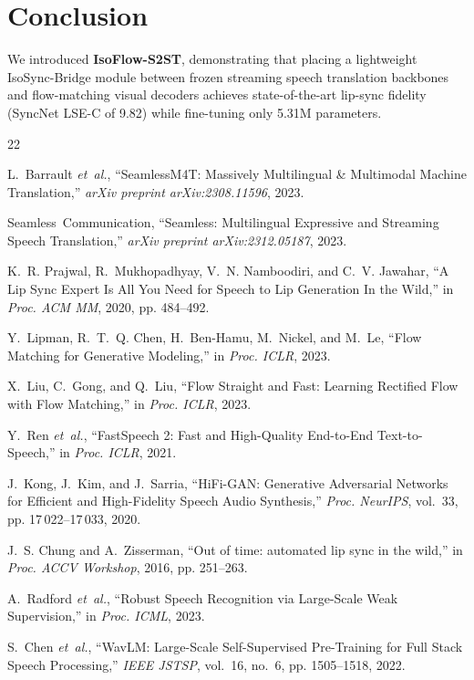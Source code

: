 \documentclass[10pt,journal,compsoc]{IEEEtran}
\begin{document}
\section{Conclusion}
We introduced \textbf{IsoFlow-S2ST}, demonstrating that placing a lightweight IsoSync-Bridge module between frozen streaming speech translation backbones and flow-matching visual decoders achieves state-of-the-art lip-sync fidelity (SyncNet LSE-C of 9.82) while fine-tuning only 5.31M parameters.

\begin{thebibliography}{22}

L.~Barrault \emph{et~al.}, ``SeamlessM4T: Massively Multilingual \& Multimodal Machine Translation,'' \emph{arXiv preprint arXiv:2308.11596}, 2023.

Seamless~Communication, ``Seamless: Multilingual Expressive and Streaming Speech Translation,'' \emph{arXiv preprint arXiv:2312.05187}, 2023.

K.~R. Prajwal, R.~Mukhopadhyay, V.~N. Namboodiri, and C.~V. Jawahar, ``A Lip Sync Expert Is All You Need for Speech to Lip Generation In the Wild,'' in \emph{Proc. ACM MM}, 2020, pp. 484--492.

Y.~Lipman, R.~T.~Q. Chen, H.~Ben-Hamu, M.~Nickel, and M.~Le, ``Flow Matching for Generative Modeling,'' in \emph{Proc. ICLR}, 2023.

X.~Liu, C.~Gong, and Q.~Liu, ``Flow Straight and Fast: Learning Rectified Flow with Flow Matching,'' in \emph{Proc. ICLR}, 2023.

Y.~Ren \emph{et~al.}, ``FastSpeech 2: Fast and High-Quality End-to-End Text-to-Speech,'' in \emph{Proc. ICLR}, 2021.

J.~Kong, J.~Kim, and J.~Sarria, ``HiFi-GAN: Generative Adversarial Networks for Efficient and High-Fidelity Speech Audio Synthesis,'' \emph{Proc. NeurIPS}, vol.~33, pp. 17\,022--17\,033, 2020.

J.~S. Chung and A.~Zisserman, ``Out of time: automated lip sync in the wild,'' in \emph{Proc. ACCV Workshop}, 2016, pp. 251--263.

A.~Radford \emph{et~al.}, ``Robust Speech Recognition via Large-Scale Weak Supervision,'' in \emph{Proc. ICML}, 2023.

S.~Chen \emph{et~al.}, ``WavLM: Large-Scale Self-Supervised Pre-Training for Full Stack Speech Processing,'' \emph{IEEE JSTSP}, vol.~16, no.~6, pp. 1505--1518, 2022.


\end{thebibliography}
\end{document}

